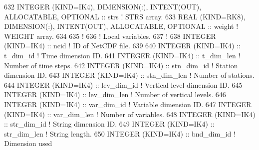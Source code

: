 \begin{DoxyCode}
632     \textcolor{keywordtype}{INTEGER (KIND=IK4)}, \textcolor{keywordtype}{DIMENSION(:)}, \textcolor{keywordtype}{INTENT(OUT)}, \textcolor{keywordtype}{ALLOCATABLE}, \textcolor{keywordtype}{OPTIONAL}    :: strs         \textcolor{comment}{! STRS array.}
633     \textcolor{keywordtype}{REAL (KIND=RK8)}, \textcolor{keywordtype}{DIMENSION(:)}, \textcolor{keywordtype}{INTENT(OUT)}, \textcolor{keywordtype}{ALLOCATABLE}, \textcolor{keywordtype}{OPTIONAL}       :: weight       \textcolor{comment}{! WEIGHT array.}
634 
635     \textcolor{comment}{!}
636     \textcolor{comment}{! Local variables.}
637     \textcolor{comment}{!}
638     \textcolor{keywordtype}{INTEGER (KIND=IK4)}          :: ncid                                                 \textcolor{comment}{! ID of NetCDF
       file.}
639 
640     \textcolor{keywordtype}{INTEGER (KIND=IK4)}          :: t\_dim\_id                                             \textcolor{comment}{! Time dimension
       ID.}
641     \textcolor{keywordtype}{INTEGER (KIND=IK4)}          :: t\_dim\_len                                            \textcolor{comment}{! Number of time
       steps.}
642     \textcolor{keywordtype}{INTEGER (KIND=IK4)}          :: stn\_dim\_id                                           \textcolor{comment}{! Station dimension
       ID.}
643     \textcolor{keywordtype}{INTEGER (KIND=IK4)}          :: stn\_dim\_len                                          \textcolor{comment}{! Number of
       stations.}
644     \textcolor{keywordtype}{INTEGER (KIND=IK4)}          :: lev\_dim\_id                                           \textcolor{comment}{! Vertical level
       dimension ID.}
645     \textcolor{keywordtype}{INTEGER (KIND=IK4)}          :: lev\_dim\_len                                          \textcolor{comment}{! Number of
       vertical levels.}
646     \textcolor{keywordtype}{INTEGER (KIND=IK4)}          :: var\_dim\_id                                           \textcolor{comment}{! Variable
       dimension ID.}
647     \textcolor{keywordtype}{INTEGER (KIND=IK4)}          :: var\_dim\_len                                          \textcolor{comment}{! Number of
       variables.}
648     \textcolor{keywordtype}{INTEGER (KIND=IK4)}          :: str\_dim\_id                                           \textcolor{comment}{! String dimension
       ID.}
649     \textcolor{keywordtype}{INTEGER (KIND=IK4)}          :: str\_dim\_len                                          \textcolor{comment}{! String length.}
650     \textcolor{keywordtype}{INTEGER (KIND=IK4)}          :: bnd\_dim\_id                                           \textcolor{comment}{! Dimension used
}
\end{DoxyCode}
